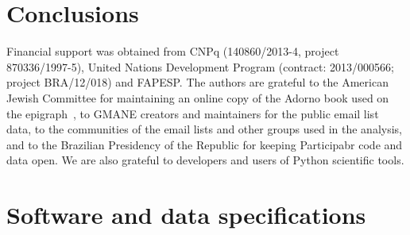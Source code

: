 \documentclass[%
	aip,
	jmp,%
	amsmath,amssymb,
	reprint,%
]{revtex4-1}
\begin{document}
\section{Conclusions}\label{sec:conc}
\begin{acknowledgments}
	Financial support was obtained from CNPq (140860/2013-4,
	project 870336/1997-5), United Nations Development Program (contract: 2013/000566; project BRA/12/018) and FAPESP. 
	The authors are grateful to the American Jewish Committee for maintaining an online copy of the Adorno book used on the epigraph~\cite{adorno}, to GMANE creators and maintainers for the public email list data, to the communities of the email lists and other groups used in the analysis, and to the Brazilian Presidency of the Republic for keeping Participabr code and data open.
	We are also grateful to developers and users of Python scientific tools.
\end{acknowledgments}


\appendix
\section{Software and data specifications}\label{ap:soft}


\end{document}
